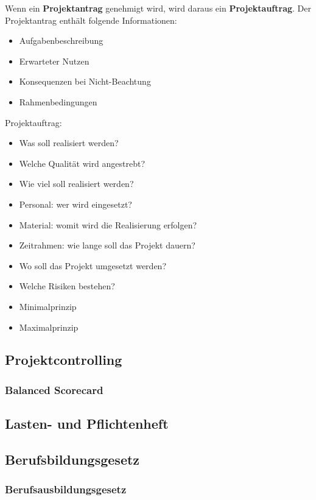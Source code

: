 Wenn ein \textbf{Projektantrag} genehmigt wird, wird daraus ein \textbf{Projektauftrag}. Der Projektantrag enthält folgende Informationen:
\begin{itemize}
	 \item Aufgabenbeschreibung
	 \item Erwarteter Nutzen
	 \item Konsequenzen bei Nicht-Beachtung
	 \item Rahmenbedingungen
\end{itemize}
Projektauftrag:
\begin{itemize}
	\item Was soll realisiert werden?
	\item Welche Qualität wird angestrebt?
	\item Wie viel soll realisiert werden?
	\item Personal: wer wird eingesetzt?
	\item Material: womit wird die Realisierung erfolgen?
	\item Zeitrahmen: wie lange soll das Projekt dauern?
	\item Wo soll das Projekt umgesetzt werden?
	\item Welche Risiken bestehen?
\end{itemize}

\begin{itemize}
	\item Minimalprinzip
	\item Maximalprinzip
\end{itemize}



\subsection{Projektcontrolling}
\subsubsection{Balanced Scorecard}

\subsection{Lasten- und Pflichtenheft}

\subsection{Berufsbildungsgesetz}
\subsubsection{Berufsausbildungsgesetz}

